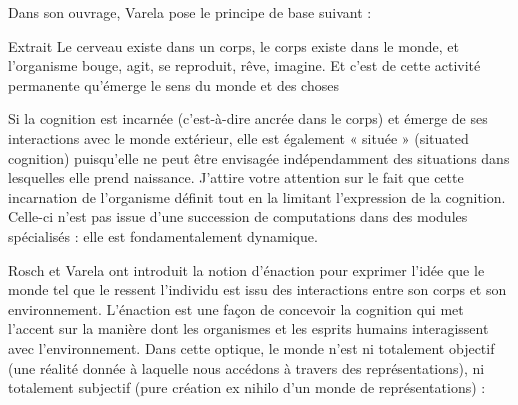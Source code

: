 
Dans son ouvrage, Varela pose le principe de base suivant : 
\begin{lecture}{Extrait}
Le cerveau existe dans un corps, le corps existe dans le monde, et l'organisme bouge, agit, se reproduit, rêve, imagine. Et c'est de cette activité permanente qu’émerge le sens du monde et des choses
\end{lecture}
Si la cognition est incarnée (c’est-à-dire ancrée dans le corps) et émerge de ses interactions avec le monde extérieur, elle est également « située » (situated cognition) puisqu’elle ne peut être envisagée indépendamment des situations dans lesquelles elle prend naissance. J’attire votre attention sur le fait que cette incarnation de l’organisme définit tout en la limitant l’expression de la cognition. Celle-ci n’est pas issue d’une succession de computations dans des modules spécialisés : elle est fondamentalement dynamique.\par


Rosch et Varela ont introduit la notion d’énaction pour exprimer l’idée que le monde tel que le ressent l'individu est issu des interactions entre son corps et son environnement. L’énaction est une façon de concevoir la cognition qui met l’accent sur la manière dont les organismes et les esprits humains interagissent avec l’environnement. Dans cette optique, le monde n’est ni totalement objectif (une réalité donnée à laquelle nous accédons à travers des représentations), ni totalement subjectif (pure création ex nihilo d’un monde de représentations) :\par

